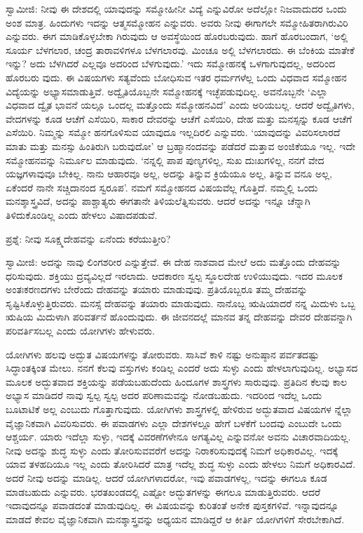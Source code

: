 ಸ್ವಾಮೀಜಿ: ನೀವು ಈ ದೇಶದಲ್ಲಿ ಯಾವುದನ್ನು ಸಮ್ಮೋಹೀನೀ ವಿದ್ಯೆ  ಎನ್ನುವಿರೋ ಅದೆಲ್ಲೋ ನಿಜವಾದುದರ ಒಂದು ಅಂಶ ಮಾತ್ರ. ಹಿಂದುಗಳು ಇದನ್ನು ಆತ್ಮಸಮ್ಮೋಹನ  ಎನ್ನುವರು. ಅವರು ನೀವು ಈಗಾಗಲೇ ಸಮ್ಮೋಹಿತರಾಗಿರುವಿರಿ ಎನ್ನುವರು. ಈಗ ಮಾಡಿಕೊಳ್ಳಬೇಕಾ ಗಿರುವುದು ಆ ಅವಸ್ಥೆಯಿಂದ ಹೊರಬರುವುದು. ಹಾಗೆ ಹೊರಬಂದಾಗ, ‘ಅಲ್ಲಿ ಸೂರ್ಯ ಬೆಳಗಲಾರ, ಚಂದ್ರ ತಾರಾವಳಿಗಳೂ ಬೆಳಗಲಾರವು. ಮಿಂಚೂ ಅಲ್ಲಿ ಬೆಳಗಲಾರದು. ಈ ಬೆಂಕಿಯ ಮಾತೇಕೆ ಇನ್ನು? ಅದು ಬೆಳಗಿದರೆ ಎಲ್ಲವೂ ಅದರಿಂದ ಬೆಳಗುವುದು.’ ಇದು ಸಮ್ಮೋಹನಕ್ಕೆ ಒಳಗಾಗುವುದಲ್ಲ, ಅದರಿಂದ ಹೊರಬರು ವುದು. ಈ ವಿಷಯಗಳು ಸತ್ಯವೆಂದು ಬೋಧಿಸುವ ಇತರ ಧರ್ಮಗಳೆಲ್ಲ ಒಂದು ವಿಧವಾದ ಸಮ್ಮೋಹನ ವಿದ್ಯೆಯನ್ನು ಅಭ್ಯಾಸಮಾಡುತ್ತಿವೆ. ಅದ್ವೈತಿಯೊಬ್ಬನೇ ಸಮ್ಮೋಹನಕ್ಕೆ ಇಚ್ಛೆಪಡುವುದಿಲ್ಲ. ಅವನೊಬ್ಬನೇ ‘ಎಲ್ಲಾ ವಿಧವಾದ ದ್ವೈತ ಭಾವನೆ ಯಲ್ಲೂ ಒಂದಲ್ಲ ಮತ್ತೊಂದು ಸಮ್ಮೋಹನವಿದೆ’ ಎಂದು ಅರಿಯಬಲ್ಲ. ಆದರೆ ಅದ್ವೈತಿಗಳು, ವೇದಗಳನ್ನು ಕೂಡ ಆಚೆಗೆ ಎಸೆಯಿರಿ, ಸಾಕಾರ ದೇವರನ್ನು ಆಚೆಗೆ ಎಸೆಯಿರಿ, ದೇಹ ಮತ್ತು ಮನಸ್ಸನ್ನು ಕೂಡ ಆಚೆಗೆ ಎಸೆಯಿರಿ. ನಿಮ್ಮನ್ನು ಸಮ್ಮೋ ಹನಗೊಳಿಸುವ ಯಾವುದೂ ಇಲ್ಲದಿರಲಿ ಎನ್ನುವರು. ‘ಯಾವುದನ್ನು ವಿವರಿಸಲಾರದೆ ಮಾತು ಮತ್ತು ಮನಸ್ಸು ಹಿಂತಿರುಗಿ ಬರುವುದೋ’ ಆ ಬ್ರಹ್ಮಾನಂದವನ್ನು ಪಡೆದರೆ ಮತ್ತಾವ ಅಂಜಿಕೆಯೂ ಇಲ್ಲ. ಇದೇ ಸಮ್ಮೋಹನವನ್ನು ನಿರ್ಮೂಲ ಮಾಡುವುದು. ‘ನನ್ನಲ್ಲಿ ಪಾಪ ಪುಣ್ಯಗಳಿಲ್ಲ, ಸುಖ ದುಃಖಗಳಿಲ್ಲ, ನನಗೆ ವೇದ ಯಜ್ಞಗಳಾವುವೂ ಬೇಕಿಲ್ಲ. ನಾನು ಆಹಾರವೂ ಅಲ್ಲ, ಅದನ್ನು ತಿನ್ನುವ ಕ್ರಿಯೆಯೂ ಅಲ್ಲ, ತಿನ್ನುವ ವನೂ ಅಲ್ಲ, ಏಕೆಂದರೆ ನಾನೇ ಸಚ್ಚಿದಾನಂದ ಸ್ವರೂಪ’. ನಮಗೆ ಸಮ್ಮೋಹನದ ವಿಷಯವೆಲ್ಲ ಗೊತ್ತಿದೆ. ನಮ್ಮಲ್ಲಿ ಒಂದು ಮನಶ್ಶಾಸ್ತ್ರವಿದೆ, ಅದನ್ನು ಪಾಶ್ಚಾತ್ಯರು ಈಗತಾನೇ ತಿಳಿಯಲೆತ್ನಿಸುವರು. ಆದರೆ ಅದನ್ನು ಇನ್ನೂ ಚೆನ್ನಾಗಿ ತಿಳಿದುಕೊಂಡಿಲ್ಲ ಎಂದು ಹೇಳಲು ವಿಷಾದಪಡುವೆ.

ಪ್ರಶ್ನೆ: ನೀವು ಸೂಕ್ಷ್ಮದೇಹವನ್ನು ಏನೆಂದು ಕರೆಯುತ್ತೀರಿ?

ಸ್ವಾಮೀಜಿ: ಅದನ್ನು ನಾವು ಲಿಂಗಶರೀರ ಎನ್ನುತ್ತೇವೆ. ಈ ದೇಹ ನಾಶವಾದ ಮೇಲೆ ಅದು ಮತ್ತೊಂದು ದೇಹವನ್ನು ಧರಿಸುವುದು. ಶಕ್ತಿಯು ದ್ರವ್ಯವಿಲ್ಲದೆ ಇರಲಾದು. ಆದಕಾರಣ ಸ್ವಲ್ಪ ಸ್ಥೂಲದೇಹ ಉಳಿಯುವುದು. ಇದರ ಮೂಲಕ ಅಂತಃಕರಣದಗಳು ಬೇರೆಂದು ದೇಹವನ್ನು ತಯಾರು ಮಾಡುವುವು. ಪ್ರತಿಯೊಬ್ಬರೂ ತಮ್ಮ ದೇಹವನ್ನು ಸೃಷ್ಟಿಸಿಕೊಳ್ಳುತ್ತಿರುವರು. ಮನಸ್ಸೆ ದೇಹವನ್ನು ತಯಾರು ಮಾಡುವುದು. ನಾನೊಬ್ಬ ಋಷಿಯಾದರೆ ನನ್ನ ಮಿದುಳು ಒಬ್ಬ ಋಷಿಯ ಮಿದುಳಾಗಿ ಪರಿವರ್ತನೆ ಹೊಂದುವುದು. ಈ ಜೀವನದಲ್ಲೆ ಮಾನವ ತನ್ನ ದೇಹವನ್ನು ದೇವರ ದೇಹವನ್ನಾಗಿ ಪರಿವರ್ತಿಸಬಲ್ಲ ಎಂದು ಯೋಗಿಗಳು ಹೇಳುವರು.

ಯೋಗಿಗಳು ಹಲವು ಅದ್ಭುತ ವಿಷಯಗಳನ್ನು ತೋರುವರು. ಸಾಸಿವೆ ಕಾಳಿ ನಷ್ಟು ಅನುಷ್ಠಾನ ಪರ್ವತದಷ್ಟು ಸಿದ್ಧಾಂತಕ್ಕಿಂತ ಮೇಲು. ನನಗೆ ಕೆಲವು ವಸ್ತುಗಳು ಕಂಡಿಲ್ಲ ಎಂದರೆ ಅದು ಸುಳ್ಳು ಎಂದು ಹೇಳಲಾಗುವುದಿಲ್ಲ. ಅಭ್ಯಾಸದ ಮೂಲಕ ಅದ್ಭುತವಾದ ಶಕ್ತಿಯನ್ನು ಪಡೆಯಬಹುದೆಂದು ಹಿಂದೂಗಳ ಶಾಸ್ತ್ರಗಳು ಸಾರುವುವು. ಪ್ರತಿದಿನ ಕೆಲವು ಕಾಲ ಅಭ್ಯಾಸ ಮಾಡಿದರೆ ನಾವು ಸ್ವಲ್ಪ ಸ್ವಲ್ಪ ಅದರ ಪರಿಣಾಮವನ್ನು ನೋಡಬಹುದು. ಇದರಿಂದ ಇದೆಲ್ಲ ಒಂದು ಬೂಟಾಟಿಕೆ ಅಲ್ಲ ಎಂಬುದು ಗೊತ್ತಾಗುವುದು. ಯೋಗಿಗಳು ಶಾಸ್ತ್ರಗಳಲ್ಲಿ ಹೇಳಿರುವ ಅದ್ಭುತವಾದ ವಿಷಯಗಳ ನ್ನೆಲ್ಲಾ ವೈಜ್ಞಾನಿಕವಾಗಿ ವಿವರಿಸುವರು. ಈ ಪವಾಡಗಳು ಎಲ್ಲಾ ದೇಶಗಳಲ್ಲೂ ಹೇಗೆ ಬಳಕೆಗೆ ಬಂದವು ಎಂಬುದೇ ಒಂದು ಆಶ್ಚರ್ಯ. ಯಾರು ಇದೆಲ್ಲಾ ಸುಳ್ಳು, ಇದಕ್ಕೆ ವಿವರಣೆಗಳೇನೂ ಅಗತ್ಯವಿಲ್ಲ ಎನ್ನುವನೋ ಅವನು ವಿಚಾರವಾದಿಯಲ್ಲ. ನೀವು ಅದನ್ನು ಶುದ್ಧ ಸುಳ್ಳು ಎಂದು ತೋರಿಸುವವರೆಗೆ ಅದನ್ನು ನಿರಾಕರಿಸುವುದಕ್ಕೆ ನಿಮಗೆ ಅಧಿಕಾರವಿಲ್ಲ. ಇದಕ್ಕೆ ಯಾವ ತಳಹದಿಯೂ ಇಲ್ಲ ಎಂದು ತೋರಿಸಿದರೆ ಮಾತ್ರ ಇದೆಲ್ಲ ಶುದ್ಧ ಸುಳ್ಳು ಎಂದು ಹೇಳಲು ನಿಮಗೆ ಅಧಿಕಾರವಿದೆ. ಅದರೆ ನೀವು ಅದನ್ನು ಮಾಡಿಲ್ಲ. ಆದರೆ ಯೋಗಿಗಳಾದರೋ, ಇವು ಪವಾಡಗಳಲ್ಲ, ಇದನ್ನು ಈಗಲೂ ಕೂಡ ಮಾಡಬಹುದು ಎನ್ನುವರು. ಭರತಖಂಡದಲ್ಲಿ ಎಷ್ಟೋ ಅದ್ಭುತಗಳನ್ನು ಈಗಲೂ ಮಾಡುತ್ತಿರುವರು. ಆದರೆ ಇದಾವುದನ್ನೂ ಪವಾಡದಂತೆ ಮಾಡುವುದಿಲ್ಲ. ಈ ವಿಷಯವನ್ನು ಕುರಿತಂತೆ ಅನೇಕ ಪುಸ್ತಕಗಳಿವೆ. ಇನ್ನಾವುದನ್ನೂ ಮಾಡದೆ ಕೇವಲ ವೈಜ್ಞಾನಿಕವಾಗಿ ಮನಶ್ಶಾಸ್ತ್ರವನ್ನು ಅಧ್ಯಯನ ಮಾಡಿದ್ದರೆ ಆ ಕೀರ್ತಿ ಯೋಗಿಗಳಿಗೆ ಸೇರಬೇಕಾಗಿದೆ.


